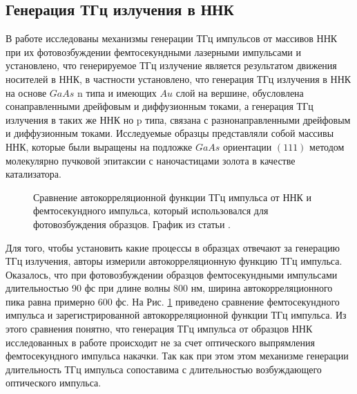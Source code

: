 \documentclass[a4paper,14pt,russian]{extreport}
\begin{document}
			\subsection{Генерация ТГц излучения в ННК}
				В работе \cite{THzGeneration} исследованы механизмы генерации ТГц импульсов от массивов ННК при их фотовозбуждении фемтосекундными лазерными импульсами и установлено, что генерируемое ТГц излучение является результатом движения носителей в ННК, в частности установлено, что генерация ТГц излучения в ННК на основе $GaAs$ n типа и имеющих $Au$ слой на вершине, обусловлена сонаправленными дрейфовым и диффузионным токами, а генерация ТГц излучения в таких же ННК но p типа, связана с разнонаправленными дрейфовым и диффузионным токами. Исследуемые образцы представляли собой массивы ННК, которые были выращены на подложке $GaAs$ ориентации $(111)$ методом молекулярно пучковой эпитаксии с наночастицами золота в качестве катализатора.\par
				\begin{figure}[h]
					\caption{Сравнение автокорреляционной функции ТГц импульса от ННК и фемтосекундного импульса, который использовался для фотовозбуждения образцов. График из статьи \cite{THzGeneration}.}
				\label{ris:THzPulseFromNNW}
				\end{figure}
				Для того, чтобы установить какие процессы в образцах отвечают за генерацию ТГц излучения, авторы измерили автокорреляционную функцию ТГц импульса. Оказалось, что при фотовозбуждении образцов фемтосекундными импульсами длительностью 90 фс при длине волны 800 нм, ширина автокорреляционного пика равна примерно 600 фс. На Рис. \ref{ris:THzPulseFromNNW} приведено сравнение фемтосекундного импульса и зарегистрированной автокорреляционной функции ТГц импульса. Из этого сравнения понятно, что генерация ТГц импульса от образцов ННК исследованных в работе происходит не за счет оптического выпрямления фемтосекундного импульса накачки. Так как при этом этом механизме генерации длительность ТГц импульса сопоставима с длительностью возбуждающего оптического импульса.\par
\end{document}

